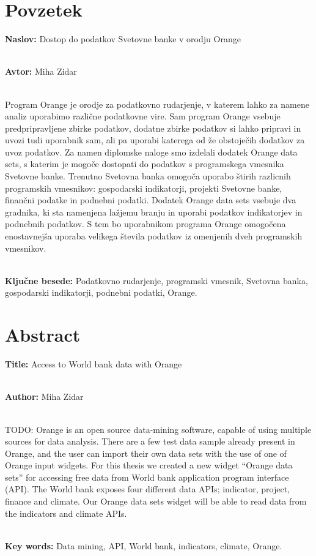 \chapter*{Povzetek}


\textbf{Naslov:} Dostop do podatkov Svetovne banke v orodju Orange

\ \\
\textbf{Avtor:} Miha Zidar

\ \\
Program Orange je orodje za podatkovno rudarjenje, v katerem
lahko za namene analiz uporabimo različne podatkovne vire. Sam program Orange
vsebuje predpripravljene zbirke podatkov, dodatne zbirke podatkov si lahko 
pripravi in uvozi tudi uporabnik sam, ali pa uporabi katerega od že obstoječih
dodatkov za uvoz podatkov. Za namen diplomske naloge smo izdelali dodatek 
Orange data sets, s katerim je mogoče dostopati do podatkov s programskega 
vmesnika Svetovne banke. Trenutno Svetovna banka omogoča uporabo štirih 
razlicnih programskih vmesnikov: gospodarski indikatorji, projekti Svetovne banke, 
finančni podatke in podnebni podatki. Dodatek Orange data sets vsebuje dva
gradnika, ki sta namenjena lažjemu branju in uporabi podatkov indikatorjev in 
podnebnih podatkov.
S tem bo uporabnikom programa Orange omogočena enostavnejša uporaba velikega števila
podatkov iz omenjenih dveh programskih vmesnikov.

\ \\
\textbf{Ključne besede:} Podatkovno rudarjenje, programski vmesnik, 
Svetovna banka, gospodarski indikatorji, podnebni podatki, Orange. 




\clearemptydoublepage

\chapter*{Abstract}


\textbf{Title:} Access to World bank data with Orange

\ \\
\textbf{Author:} Miha Zidar

\ \\
TODO: Orange is an open source data-mining software, capable of using multiple
sources for data analysis. There are a few test data sample already present
in Orange, and the user can import their own data sets with the use of one of
Orange input widgets. For this thesis we created a new widget ``Orange data sets''
for accessing free data from World bank application program interface (API).
The World bank exposes four different data APIs; indicator, project, finance
and climate. Our Orange data sets widget will be able to read data from the
indicators and climate APIs.


\ \\
\textbf{Key words:} Data mining, API, World bank, indicators, climate, Orange.

